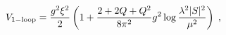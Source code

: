 \begin{equation}
\label{eq:Dlifting}
V_{\rm 1-loop} = \frac{g^2 \xi^2}{2} \left(1 + \frac{2+2Q+Q^2}{8
\pi^2} g^2 \log\frac{\lambda^2  |S|^2}{\mu^2}\right) \;, 
\end{equation} 
